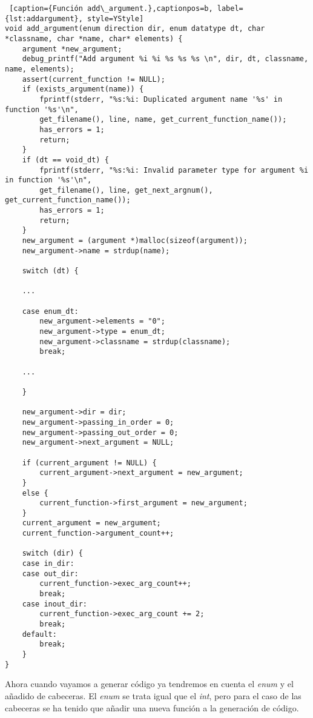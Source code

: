 \begin{minipage}{\linewidth}
\begin{lstlisting} [caption={Función add\_argument.},captionpos=b, label={lst:addargument}, style=YStyle]
void add_argument(enum direction dir, enum datatype dt, char *classname, char *name, char* elements) {
	argument *new_argument;
	debug_printf("Add argument %i %i %s %s %s \n", dir, dt, classname, name, elements);
	assert(current_function != NULL);
	if (exists_argument(name)) {
		fprintf(stderr, "%s:%i: Duplicated argument name '%s' in function '%s'\n",
		get_filename(), line, name, get_current_function_name());
		has_errors = 1;
		return;
	}
	if (dt == void_dt) {
		fprintf(stderr, "%s:%i: Invalid parameter type for argument %i in function '%s'\n",
		get_filename(), line, get_next_argnum(), get_current_function_name());
		has_errors = 1;
		return;
	}
	new_argument = (argument *)malloc(sizeof(argument));
	new_argument->name = strdup(name);

    switch (dt) {
    
    ...
    
    case enum_dt:
    	new_argument->elements = "0";
    	new_argument->type = enum_dt;
    	new_argument->classname = strdup(classname);
    	break;
    
    ...
    
    }
    
    new_argument->dir = dir;
    new_argument->passing_in_order = 0;
    new_argument->passing_out_order = 0;
    new_argument->next_argument = NULL;
    
    if (current_argument != NULL) {
    	current_argument->next_argument = new_argument;
    } 
    else {
    	current_function->first_argument = new_argument;
    }
    current_argument = new_argument;
    current_function->argument_count++;
    
    switch (dir) {
    case in_dir:
    case out_dir:
    	current_function->exec_arg_count++;
    	break;
    case inout_dir:
    	current_function->exec_arg_count += 2;
    	break;
    default:
    	break;
    }
}
\end{lstlisting}
\end{minipage}

\bigskip

Ahora cuando vayamos a generar código ya tendremos en cuenta el \textit{enum} y el añadido de cabeceras. El \textit{enum} se trata igual que el \textit{int}, pero para el caso de las cabeceras se ha tenido que añadir una nueva función a la generación de código. 

